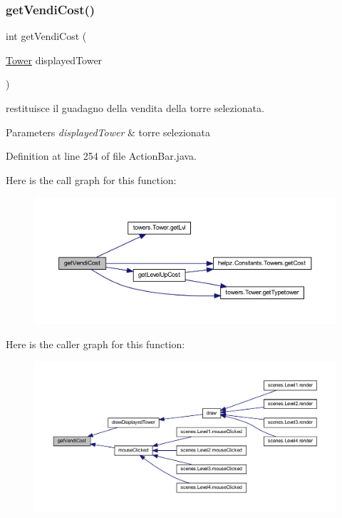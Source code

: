 \subsubsection{\texorpdfstring{get\+Vendi\+Cost()}{getVendiCost()}}
{\footnotesize\ttfamily int get\+Vendi\+Cost (\begin{DoxyParamCaption}\item[{\hyperlink{classtowers_1_1_tower}{Tower}}]{displayed\+Tower }\end{DoxyParamCaption})}



restituisce il guadagno della vendita della torre selezionata. 


\begin{DoxyParams}{Parameters}
{\em displayed\+Tower} & torre selezionata \\
\hline
\end{DoxyParams}


Definition at line 254 of file Action\+Bar.\+java.

Here is the call graph for this function\+:\nopagebreak
\begin{figure}[H]
\begin{center}
\leavevmode
\includegraphics[width=350pt]{classui_1_1_action_bar_aef810268cda93505da735c6c81136e00_cgraph}
\end{center}
\end{figure}
Here is the caller graph for this function\+:\nopagebreak
\begin{figure}[H]
\begin{center}
\leavevmode
\includegraphics[width=350pt]{classui_1_1_action_bar_aef810268cda93505da735c6c81136e00_icgraph}
\end{center}
\end{figure}
\mbox{\label{classui_1_1_action_bar_a3de978b9745ea5fdbe99d556e40166f6}} 
